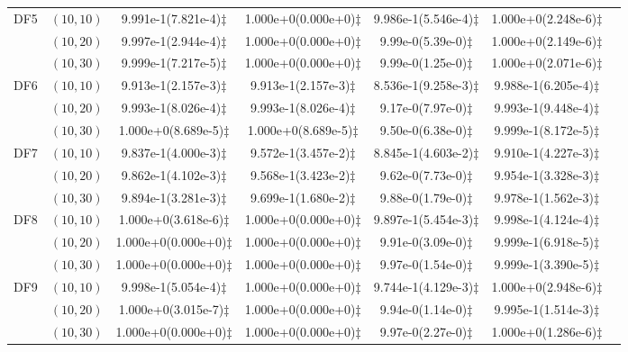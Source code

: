 \documentclass[review]{elsarticle}
\begin{document}
\begin{table*}[!tbh]
{{\begin{tabular} {ccccccc}
\hline  \multirow{3}{*}{DF5}
&$(10,10)$ &9.991e-1(7.821e-4)$\ddagger$ &1.000e+0(0.000e+0)$\ddagger$ &9.986e-1(5.546e-4)$\ddagger$ &1.000e+0(2.248e-6)$\ddagger$ \\
&$(10,20)$ &9.997e-1(2.944e-4)$\ddagger$ &1.000e+0(0.000e+0)$\ddagger$ &9.99e-0(5.39e-0)$\ddagger$ &1.000e+0(2.149e-6)$\ddagger$ \\
&$(10,30)$ &9.999e-1(7.217e-5)$\ddagger$ &1.000e+0(0.000e+0)$\ddagger$ &9.99e-0(1.25e-0)$\ddagger$ &1.000e+0(2.071e-6)$\ddagger$ \\
\hline  \multirow{3}{*}{DF6}
&$(10,10)$ &9.913e-1(2.157e-3)$\ddagger$ &9.913e-1(2.157e-3)$\ddagger$ &8.536e-1(9.258e-3)$\ddagger$ &9.988e-1(6.205e-4)$\ddagger$ \\
&$(10,20)$ &9.993e-1(8.026e-4)$\ddagger$ &9.993e-1(8.026e-4)$\ddagger$ &9.17e-0(7.97e-0)$\ddagger$ &9.993e-1(9.448e-4)$\ddagger$ \\
&$(10,30)$ &1.000e+0(8.689e-5)$\ddagger$ &1.000e+0(8.689e-5)$\ddagger$ &9.50e-0(6.38e-0)$\ddagger$ &9.999e-1(8.172e-5)$\ddagger$ \\
\hline  \multirow{3}{*}{DF7}
&$(10,10)$ &9.837e-1(4.000e-3)$\ddagger$ &9.572e-1(3.457e-2)$\ddagger$ &8.845e-1(4.603e-2)$\ddagger$ &9.910e-1(4.227e-3)$\ddagger$ \\
&$(10,20)$ &9.862e-1(4.102e-3)$\ddagger$ &9.568e-1(3.423e-2)$\ddagger$ &9.62e-0(7.73e-0)$\ddagger$ &9.954e-1(3.328e-3)$\ddagger$ \\
&$(10,30)$ &9.894e-1(3.281e-3)$\ddagger$ &9.699e-1(1.680e-2)$\ddagger$ &9.88e-0(1.79e-0)$\ddagger$ &9.978e-1(1.562e-3)$\ddagger$ \\
\hline  \multirow{3}{*}{DF8}
&$(10,10)$ &1.000e+0(3.618e-6)$\ddagger$ &1.000e+0(0.000e+0)$\ddagger$ &9.897e-1(5.454e-3)$\ddagger$ &9.998e-1(4.124e-4)$\ddagger$ \\
&$(10,20)$ &1.000e+0(0.000e+0)$\ddagger$ &1.000e+0(0.000e+0)$\ddagger$ &9.91e-0(3.09e-0)$\ddagger$ &9.999e-1(6.918e-5)$\ddagger$ \\
&$(10,30)$ &1.000e+0(0.000e+0)$\ddagger$ &1.000e+0(0.000e+0)$\ddagger$ &9.97e-0(1.54e-0)$\ddagger$ &9.999e-1(3.390e-5)$\ddagger$ \\
\hline  \multirow{3}{*}{DF9}
&$(10,10)$ &9.998e-1(5.054e-4)$\ddagger$ &1.000e+0(0.000e+0)$\ddagger$ &9.744e-1(4.129e-3)$\ddagger$ &1.000e+0(2.948e-6)$\ddagger$ \\
&$(10,20)$ &1.000e+0(3.015e-7)$\ddagger$ &1.000e+0(0.000e+0)$\ddagger$ &9.94e-0(1.14e-0)$\ddagger$ &9.995e-1(1.514e-3)$\ddagger$ \\
&$(10,30)$ &1.000e+0(0.000e+0)$\ddagger$ &1.000e+0(0.000e+0)$\ddagger$ &9.97e-0(2.27e-0)$\ddagger$ &1.000e+0(1.286e-6)$\ddagger$ \\

\end{tabular}}}
\end{table*}
\end{document}

